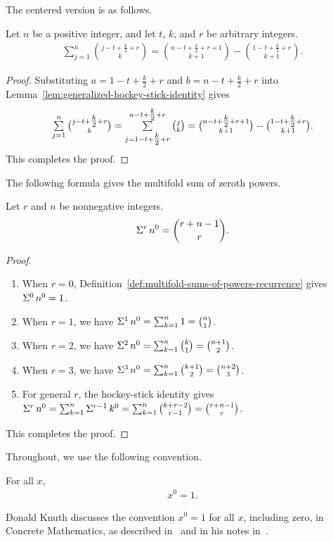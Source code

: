 The centered version is as follows.
\begin{lemma}
  \label{lem:centered-hockey-stick-identity}
  Let $n$ be a positive integer, and let $t$, $k$, and $r$ be arbitrary integers.
  \begin{align*}
    \sum_{j=1}^{n} \binom{j -t + \frac{k}{2} +r}{k}
    = \binom{n -t + \frac{k}{2} + r +1}{k+1} - \binom{1 -t + \tfrac{k}{2} +r}{k+1}.
  \end{align*}
  \begin{proof}
    Substituting $a=1 -t + \tfrac{k}{2} +r$ and $b=n-t+ \tfrac{k}{2} +r$ into Lemma~\eqref{lem:generalized-hockey-stick-identity} gives
    \begin{align*}
      \mathop{\textstyle\sum}_{j=1}^{n} \tbinom{j -t + \tfrac{k}{2} +r}{k} =
      \mathop{\textstyle\sum}_{j=1 -t + \tfrac{k}{2} +r}^{n -t + \tfrac{k}{2} +r} \tbinom{j}{k}
      = \tbinom{n -t + \tfrac{k}{2} + r +1}{k+1} - \tbinom{1 -t + \tfrac{k}{2} +r}{k+1}.
    \end{align*}
    This completes the proof.
  \end{proof}
\end{lemma}
The following formula gives the multifold sum of zeroth powers.
\begin{lemma}
  \label{lem:multifold-sum-of-zero-powers}
  Let $r$ and $n$ be nonnegative integers.
  \begin{align*}
    \Sigma^{r}\,{n}^{0} = \binom{r+n-1}{r}.
  \end{align*}
  \begin{proof}
    \leavevmode\par
    \begin{enumerate}
      \item When $r=0$, Definition~\eqref{def:multifold-sums-of-powers-recurrence} gives $\Sigma^{0}\,{n}^{0} = 1$.
      \item When $r=1$, we have
        $\Sigma^{1}\,{n}^{0}
        = \mathop{\textstyle\sum}_{k=1}^{n} 1 = \tbinom{n}{1}$.
      \item When $r=2$, we have
        $\Sigma^{2}\,{n}^{0}
        = \mathop{\textstyle\sum}_{k=1}^{n} \tbinom{k}{1}
        = \tbinom{n+1}{2}$.
      \item When $r=3$, we have
        $\Sigma^{3}\,{n}^{0}
        = \mathop{\textstyle\sum}_{k=1}^{n} \tbinom{k+1}{2}
        = \tbinom{n+2}{3}$.
      \item For general $r$, the hockey-stick identity gives
        $\Sigma^{r}\,{n}^{0}
        =  \mathop{\textstyle\sum}_{k=1}^{n} \Sigma^{r-1}\,{k}^{0}
        =  \mathop{\textstyle\sum}_{k=1}^{n} \tbinom{k+r-2}{r-1}
        = \tbinom{r+n-1}{r}$.
    \end{enumerate}
    This completes the proof.
  \end{proof}
\end{lemma}
Throughout, we use the following convention.
\begin{convention} For all $x$,
  \begin{align*}
    x^0 = 1.
  \end{align*}
\end{convention}
Donald Knuth discusses the convention $x^0=1$ for all $x$, including zero, in Concrete Mathematics, as described in~\cite[p.~162]{graham1994concrete} and in his notes in~\cite{knuth1992notesnotation}.
